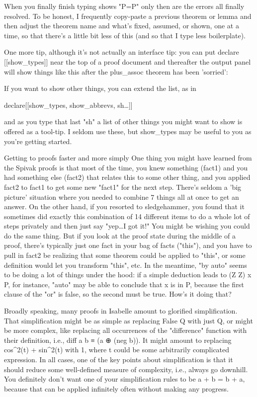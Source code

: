 When you finally finish typing 
shows "P=P"
only then are the errors all finally resolved. To be honest, I frequently copy-paste a previous theorem or lemma and then adjust the theorem name and what's fixed, assumed, or shown, one at a time, so that there's a little bit less of this (and so that I type less boilerplate). 

One more tip, although it's not actually an interface tip: you can put 
declare [[show_types]]
near the top of a proof document and thereafter the output panel will show things like this after the plus_assoc theorem has been 'sorried':

If you want to show other things, you can extend the list, as in 

declare[[show_types, show_abbrevs, sh…]]

and as you type that last "sh" a list of other things you might want to show is offered as a tool-tip. I seldom use these, but show_types may be useful to you as you're getting started. 

Getting to proofs faster and more simply
One thing you might have learned from the Spivak proofs is that most of the time, you knew something (fact1) and you had something else (fact2) that relates this to some other thing, and you applied fact2 to fact1 to get some new "fact1" for the next step. There's seldom a 'big picture' situation where you needed to combine 7 things all at once to get an answer. On the other hand, if you resorted to sledgehammer, you found that it sometimes did exactly this combination of 14 different items to do a whole lot of steps privately and then just say "yep…I got it!" You might be wishing you could do the same thing. But if you look at the proof state during the middle of a proof, there's typically just one fact in your bag of facts ("this"), and you have to pull in fact2 be realizing that some theorem could be applied to "this", or some definition would let you transform "this", etc. In the meantime, "by auto" seems to be doing a lot of things under the hood: if a simple deduction leads to (Z \notequal Z) \/ x \in P, for instance, "auto" may be able to conclude that x is in P, because the first clause of the "or" is false, so the second must be true. How's it doing that? 

Broadly speaking, many proofs in Isabelle amount to glorified simplification. That simplification might be as simple as replacing False \/ Q with just Q, or might be more complex, like replacing all occurrences of the "difference" function with their definition, i.e., diff a b ≡ (a ⊕ (neg b)). It might amount to replacing cos^2(t) + sin^2(t) with 1, where t could be some arbitrarily complicated expression. In all cases, one of the key points about simplification is that it should reduce some well-defined measure of complexity, i.e., always go downhill. You definitely don't want one of your simplification rules to be a + b = b + a, because that can be applied infinitely often without making any progress. 

